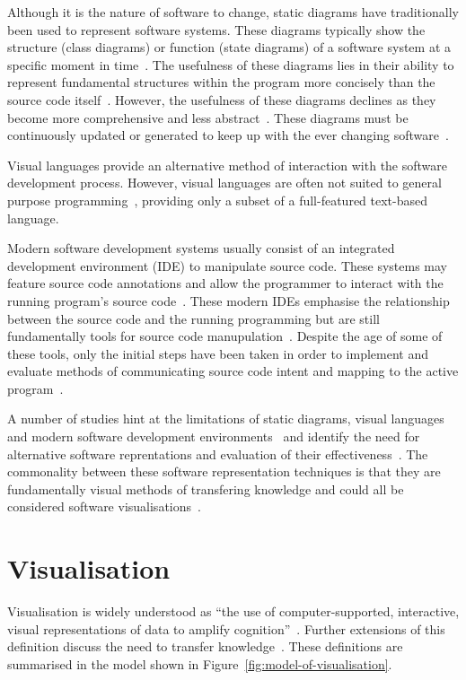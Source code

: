Although it is the nature of software to change, static diagrams have traditionally been used to represent software systems. These diagrams typically show the structure (class diagrams) or function (state diagrams) of a software system at a specific moment in time~\cite{Rumbaugh2004}. The usefulness of these diagrams lies in their ability to represent fundamental structures within the program more concisely than the source code itself~. However, the usefulness of these diagrams declines as they become more comprehensive and less abstract~. These diagrams must be continuously updated or generated to keep up with the ever changing software~.

Visual languages provide an alternative method of interaction with the software development process. However, visual languages are often not suited to general purpose programming~\cite{Myers1989}, providing only a subset of a full-featured text-based language.

Modern software development systems usually consist of an integrated development environment (IDE) to manipulate source code. These systems may feature source code annotations and allow the programmer to interact with the running program's source code~. These modern IDEs emphasise the relationship between the source code and the running programming but are still fundamentally tools for source code manupulation~. Despite the age of some of these tools, only the initial steps have been taken in order to implement and evaluate methods of communicating source code intent and mapping to the active program~.

A number of studies hint at the limitations of static diagrams, visual languages and modern software development environments~ and identify the need for alternative software reprentations and evaluation of their effectiveness~. The commonality between these software representation techniques is that they are fundamentally visual methods of transfering knowledge and could all be considered software visualisations~.

\section{Visualisation}

Visualisation is widely understood as ``the use of computer-supported, interactive, visual representations of data to amplify cognition''~\cite{Card1999}. Further extensions of this definition discuss the need to transfer knowledge~\cite{Burkhard}. These definitions are summarised in the model shown in Figure~\ref{fig:model-of-visualisation}.

